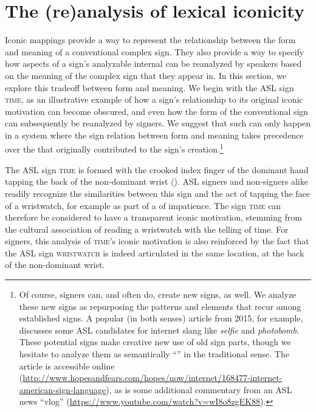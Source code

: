 \documentclass[output=paper,
modfonts
]{LSP/langsci}
\begin{document}
\section{The (re)analysis of lexical iconicity}\label{sec:3}
Iconic mappings provide a way to represent the relationship between the form and meaning of a conventional complex sign. They also provide a way to specify how aspects of a sign's analyzable internal  can be reanalyzed by speakers based on the meaning of the complex sign that they appear in. In this section, we explore this tradeoff between form and meaning. We begin with the ASL sign \textsc{time,} as an illustrative example of how a sign's relationship to its original iconic motivation can become obscured, and even how the form of the conventional sign can subsequently be reanalyzed by signers. We suggest that such  can only happen in a system where the sign relation between form and meaning takes precedence over the   that originally contributed to the sign's creation.\footnote{ Of course, signers can, and often do, create new signs, as well. We analyze these new signs as repurposing the patterns and elements that recur among established signs. A popular (in both senses) article from 2015, for example, discusses some ASL candidates for internet slang like \textit{selfie} and \textit{photobomb}. These potential signs make creative new use of old sign parts, though we hesitate to analyze them as semantically ``'' in the traditional sense. The article is accessible online (\url{http://www.hopesandfears.com/hopes/now/internet/168477-internet-american-sign-language}), as is some additional commentary from an ASL news ``vlog'' (\url{https://www.youtube.com/watch?v=wI8o8zgEK88}).} 

The ASL sign \textsc{time} is formed with the crooked index finger of the dominant hand tapping the back of the non-dominant wrist (). ASL signers and non-signers alike readily recognize the similarities between this sign and the act of tapping the face of a wristwatch, for example as part of a  of impatience. The sign \textsc{time} can therefore be considered to have a transparent iconic motivation, stemming from the cultural association of reading a wristwatch with the telling of time. For signers, this analysis of \textsc{time}'s iconic motivation is also reinforced by the fact that the ASL sign \textsc{wristwatch} is indeed articulated in the same location, at the back of the non-dominant wrist.
\end{document}

